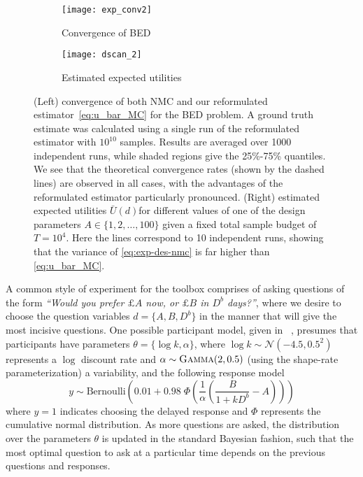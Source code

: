 \begin{figure}[t]
	\centering
	\begin{subfigure}[b]{0.49\textwidth}
		\centering
		\texttt{[image: exp\_conv2]}
		\caption{Convergence of BED\label{fig:exp-conv}}
	\end{subfigure}
		\begin{subfigure}[b]{0.49\textwidth}
			\centering
			\texttt{[image: dscan\_2]}
			\caption{Estimated expected utilities \label{fig:exp-d-scan}}
		\end{subfigure}
		\vspace{5pt}
	\caption{(Left) convergence of both NMC and our reformulated
		estimator~\eqref{eq:u_bar_MC} for the BED problem.
		A ground truth estimate was calculated using a single run of the reformulated
		estimator with $10^{10}$ samples.
		Results are averaged over 1000 independent runs, while shaded regions give the 25\%-75\% quantiles. We
		see that the theoretical convergence rates (shown by the dashed lines) are observed in all cases,
		with the advantages of the reformulated estimator particularly pronounced.
		(Right) estimated expected utilities $\bar{U}(d)$for 
		different values of one of the design parameters $A \in \{1,2,\dots,100\}$ given a fixed total
		sample budget of $T=10^4$.  Here the lines correspond to 10 independent runs, showing
		that the variance of \eqref{eq:exp-des-nmc} is far higher than \eqref{eq:u_bar_MC}.
		}
\end{figure}

A common style of experiment for the toolbox comprises of asking questions of the form 
\emph{``Would you prefer $\pounds A$ now, or $\pounds B$ in $D^b$ days?''}, where we desire
to choose the question  variables $d = \{A,B,D^b\}$ in the manner that will give the most 
incisive questions.  One possible participant model, given in ~\citep{vincent2016hierarchical},
presumes that participants have parameters $\theta=\{\log k,\alpha\}$, where $\log k \sim \mathcal{N}(-4.5,0.5^2)$ 
represents a $\log$ discount rate and $\alpha\sim \textsc{Gamma}(2,0.5)$ (using the shape-rate parameterization) a variability, and the following response model
\begin{equation}
\label{eq:design:darc}
y \sim \mathrm{Bernoulli} \left(0.01 + 0.98 \; \Phi\left(\frac{1}{\alpha} \left(\frac{B}{1+k D^b}-A\right)\right)\right)
\end{equation}
where $y=1$ indicates choosing the delayed response and $\Phi$ represents the 
cumulative normal distribution. As more questions are asked, the distribution 
over the parameters $\theta$ is updated in the standard Bayesian fashion, such
that the most optimal question to ask at a particular time depends on the previous questions
and responses.  

